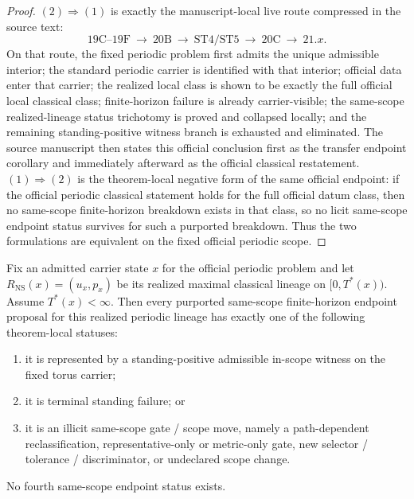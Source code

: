 \begin{proof}
$(2)\Rightarrow(1)$ is exactly the manuscript-local live route compressed in the source text:
\[
19\mathrm{C}\text{--}19\mathrm{F}\ \to\ 20\mathrm{B}\ \to\ \mathrm{ST}4/\mathrm{ST}5\ \to\ 20\mathrm{C}\ \to\ 21.x.
\]
On that route, the fixed periodic problem first admits the unique admissible interior; the standard periodic carrier is identified with that interior; official data enter that carrier; the realized local class is shown to be exactly the full official local classical class; finite-horizon failure is already carrier-visible; the same-scope realized-lineage status trichotomy is proved and collapsed locally; and the remaining standing-positive witness branch is exhausted and eliminated. The source manuscript then states this official conclusion first as the transfer endpoint corollary and immediately afterward as the official classical restatement. $(1)\Rightarrow(2)$ is the theorem-local negative form of the same official endpoint: if the official periodic classical statement holds for the full official datum class, then no same-scope finite-horizon breakdown exists in that class, so no licit same-scope endpoint status survives for such a purported breakdown. Thus the two formulations are equivalent on the fixed official periodic scope.\cite{MaleyCarrierNS}
\end{proof}

\begin{theorem}
\label{thm:ns-trichotomy-exhaustive}
Fix an admitted carrier state $x$ for the official periodic problem and let $R_{\mathrm{NS}}(x)=(u_x,p_x)$ be its realized maximal classical lineage on $[0,T^*(x))$. Assume $T^*(x)<\infty$. Then every purported same-scope finite-horizon endpoint proposal for this realized periodic lineage has exactly one of the following theorem-local statuses:
\begin{enumerate}
  \item[(i)] it is represented by a standing-positive admissible in-scope witness on the fixed torus carrier;
  \item[(ii)] it is terminal standing failure; or
  \item[(iii)] it is an illicit same-scope gate / scope move, namely a path-dependent reclassification, representative-only or metric-only gate, new selector / tolerance / discriminator, or undeclared scope change.
\end{enumerate}
No fourth same-scope endpoint status exists.
\end{theorem}

